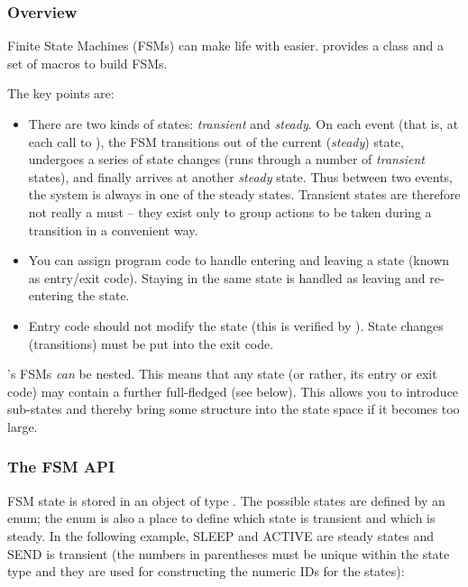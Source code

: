 \subsubsection{Overview}

Finite State Machines (FSMs)
can make life with  easier. {\opp} provides a
class and a set of macros to build FSMs.

The key points are:
\begin{itemize}
\item{There are two kinds of states:
    \textit{transient} and
    \textit{steady}. On each event (that is, at
    each call to ), the FSM transitions out of
    the current (\textit{steady}) state, undergoes a series of state
    changes (runs through a number of \textit{transient} states), and
    finally arrives at another \textit{steady} state. Thus between two
    events, the system is always in one of the steady states.
    Transient states are therefore not really a must -- they exist
    only to group actions to be taken during a transition in a
    convenient way.}
\item{You can assign program code to handle entering and leaving a state
    (known as entry/exit code).
    Staying in the same state is handled as leaving and re-entering
    the state.}
\item{Entry code should not modify the state (this is verified by
    {\opp}).  State changes (transitions) must be put into the exit
    code.}
\end{itemize}

{\opp}'s FSMs \textit{can} be nested. This means
that any state (or rather, its entry or exit code) may contain a
further full-fledged  (see below). This allows you
to introduce sub-states and thereby bring some structure into the
state space if it becomes too large.


\subsubsection{The FSM API}


FSM state is stored in an object of type . The possible states
are defined by an enum; the enum is also a place to define which
state is transient and which is steady. In the following example, SLEEP
and ACTIVE are steady states and SEND is transient (the numbers
in parentheses must be unique within the state type and they are used
for constructing the numeric IDs for the states):

